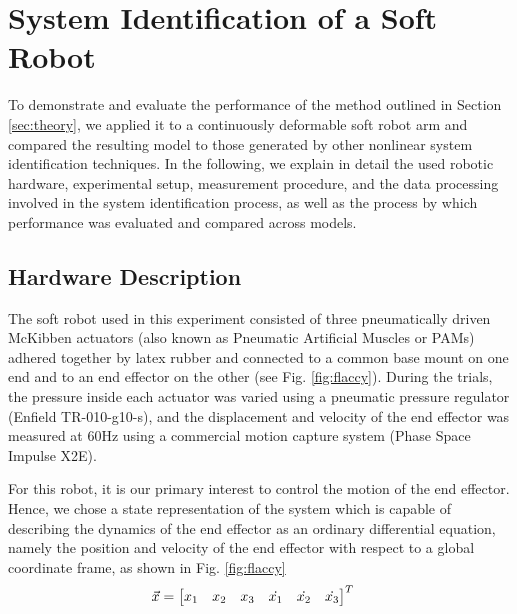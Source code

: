 \section{System Identification of a Soft Robot}
\label{sec:experiment}

To demonstrate and evaluate the performance of the method outlined in Section \ref{sec:theory}, we applied it to a continuously deformable soft robot arm and compared the resulting model to those generated by other nonlinear system identification techniques.
In the following, we explain in detail the used robotic hardware, experimental setup, measurement procedure, and the data processing involved in the system identification process, as well as the process by which performance was evaluated and compared across models.


\subsection{Hardware Description}

The soft robot used in this experiment consisted of three pneumatically driven McKibben actuators (also known as Pneumatic Artificial Muscles or PAMs) adhered together by latex rubber and connected to a common base mount on one end and to an end effector on the other (see Fig. \ref{fig:flaccy}).
During the trials, the pressure inside each actuator was varied using a pneumatic pressure regulator (Enfield TR-010-g10-s), and the displacement and velocity of the end effector was measured at $60 \text{Hz}$ using a commercial motion capture system (Phase Space Impulse X2E).

For this robot, it is our primary interest to control the motion of the end effector.
Hence, we chose a state representation of the system which is capable of describing the dynamics of the end effector as an ordinary differential equation, namely the position and velocity of the end effector with respect to a global coordinate frame, as shown in Fig. \ref{fig:flaccy}
\begin{align}
    \vec{x} &= \begin{bmatrix}  x_1 & x_2 & x_3 & \dot{x_1} & \dot{x_2} & \dot{x_3}  \end{bmatrix}^T
    \label{eq:state}
\end{align}

